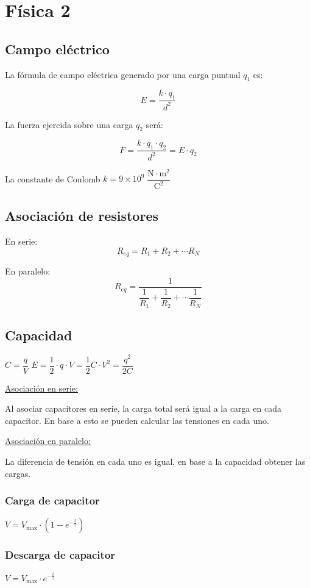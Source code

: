 \section{Física 2}

\subsection*{Campo eléctrico}

La fórmula de campo eléctrica generado por una carga puntual $q_1$ es:

$$E = \dfrac{k \cdot q_1}{d^2}$$

La fuerza ejercida sobre una carga $q_2$ será:

$$F = \dfrac{k\cdot q_1 \cdot q_2}{d^2} = E \cdot q_2$$ 

La constante de Coulomb $k = 9\times 10^{9}\;\dfrac{\text{N}\cdot \text{m}^2}{\text{C}^2}$


\subsection*{Asociación de resistores}

\begin{multicols}{2}

En serie:
$$R_{eq} = R_1 + R_2 + \cdots R_N$$

En paralelo:
$$R_{eq} = \dfrac{1}{\dfrac{1}{R_1} + \dfrac{1}{R_2} + \cdots \dfrac{1}{R_N}}$$
\end{multicols}

\subsection*{Capacidad}

\hfil
$C = \dfrac{q}{V}$
\hfil
$E = \dfrac{1}{2}\cdot q \cdot V = \dfrac{1}{2} C \cdot V^2 = \dfrac{q^2}{2C}$
\hfil

\vspace{\baselineskip}
\noindent
\underline{Asociación en serie:}

Al asociar capacitores en serie, la carga total será igual a la carga en cada capacitor. En base a esto se pueden calcular las tensiones en cada uno.

\vspace{\baselineskip}
\noindent
\underline{Asociación en paralelo:}

La diferencia de tensión en cada uno es igual, en base a la capacidad obtener las cargas.

\begin{multicols}{2}
    \subsubsection*{Carga de capacitor}    
    \hfil
    $V = V_{\max} \cdot \left(1-e^{-\frac{t}{\tau}} \right)$
    \hfil

    \subsubsection*{Descarga de capacitor}
    \hfil
    $V = V_{\max} \cdot e^{-\frac{t}{\tau}}$
    \hfil
\end{multicols}

